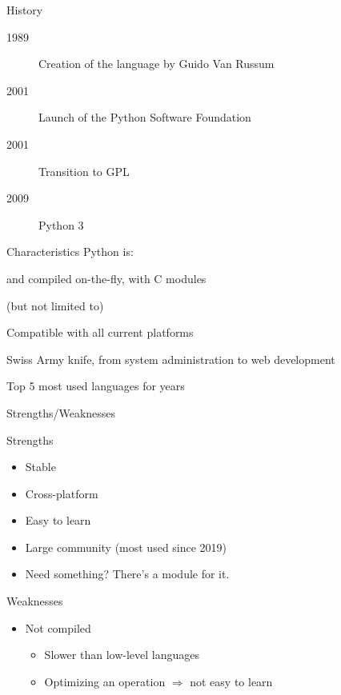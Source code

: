 \begin{frame}{History}
  \begin{description}
  \item[1989] Creation of the language by Guido Van Russum
  \item[2001] Launch of the Python Software Foundation
  \item[2001] Transition to GPL
  \item[2009] Python 3
  \end{description}
\end{frame}

\begin{frame}{Characteristics}
  Python is:
  \begin{description}[<+(1)->]
  \item[Interpreted] and compiled on-the-fly, with C modules
  \item[Object-oriented] (but not limited to)
  \item[Portable] Compatible with all current platforms
  \item[Flexible] Swiss Army knife, from system administration to web development
  \item[Popular] Top 5 most used languages for years
  \end{description}
\end{frame}

\begin{frame}{Strengths/Weaknesses}
  \begin{minipage}[l]{0.49\linewidth}
    Strengths
    \begin{itemize}
    \item Stable
    \item Cross-platform
    \item Easy to learn
    \item Large community (most used since 2019)
    \item Need something? There's a module for it.
    \end{itemize}
  \end{minipage}\hfill
  \begin{minipage}[l]{0.49\linewidth}
    Weaknesses
    \begin{itemize}
    \item Not compiled
      \begin{itemize}
      \item Slower than low-level languages
      \item Optimizing an operation $\Rightarrow$ not easy to learn
      \end{itemize}
    \end{itemize}
  \end{minipage}\hfill
\end{frame}


